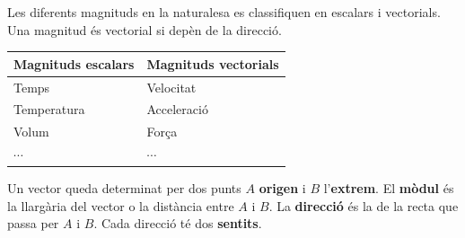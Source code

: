 
\begin{blueshaded}
	Les diferents magnituds en la naturalesa es classifiquen en escalars i vectorials. Una magnitud és vectorial si depèn de la direcció.
	\begin{center}
	\begin{tabular}{p{} | p{}}
		\textbf{Magnituds escalars} & \textbf{Magnituds vectorials} \\ \hline
		Temps       & Velocitat \\
		Temperatura & Acceleració \\
		Volum       & Força \\
		$\cdots$   & $\cdots$ 
	\end{tabular}
	\end{center}

	Un vector queda determinat per dos punts $A$ \textbf{origen} i $B$ l'\textbf{extrem}. El \textbf{mòdul} és la llargària del vector o la distància entre $A$ i $B$. La \textbf{direcció} és la de la recta que passa per $A$ i $B$. Cada direcció té dos \textbf{sentits}.
\end{blueshaded}

